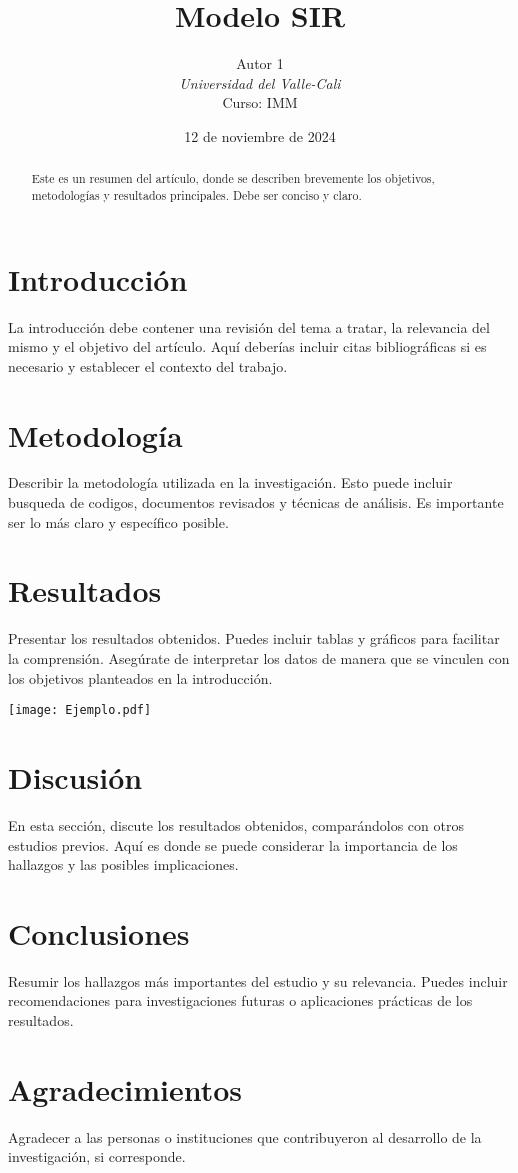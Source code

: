 \documentclass[twocolumn]{article}
\title{Modelo SIR}
\author{Autor 1 \\ \textit{Universidad del Valle-Cali}\\ Curso: IMM}
\date{12 de noviembre de 2024}
\begin{document}
  

\maketitle  

\begin{abstract}  
  Este es un resumen del artículo, donde se describen brevemente los objetivos, metodologías y resultados principales. Debe ser conciso y claro.  
\end{abstract}  

\section{Introducción}  
La introducción debe contener una revisión del tema a tratar, la relevancia del mismo y el objetivo del artículo. Aquí deberías incluir citas bibliográficas si es necesario y establecer el contexto del trabajo.
\cite{smith2004sir}

\section{Metodología}  
Describir la metodología utilizada en la investigación. Esto puede incluir busqueda de codigos, documentos revisados y técnicas de análisis. Es importante ser lo más claro y específico posible.  

\section{Resultados}  
Presentar los resultados obtenidos. Puedes incluir tablas y gráficos para facilitar la comprensión. Asegúrate de interpretar los datos de manera que se vinculen con los objetivos planteados en la introducción.  

\texttt{[image: Ejemplo.pdf]}
\section{Discusión}  
En esta sección, discute los resultados obtenidos, comparándolos con otros estudios previos. Aquí es donde se puede considerar la importancia de los hallazgos y las posibles implicaciones.  

\section{Conclusiones}  
Resumir los hallazgos más importantes del estudio y su relevancia. Puedes incluir recomendaciones para investigaciones futuras o aplicaciones prácticas de los resultados.  

\section*{Agradecimientos}  
Agradecer a las personas o instituciones que contribuyeron al desarrollo de la investigación, si corresponde.
 
 
%
\end{document}
